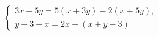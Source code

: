\begin{ex}
	\begin{condition}
		\( \left\{
		\begin{array}{l}
			3x+5y=5(x+3y)-2(x+5y),\\
			y-3+x=2x+(x+y-3)
		\end{array}
		\right. \)
	\end{condition}
\end{ex}